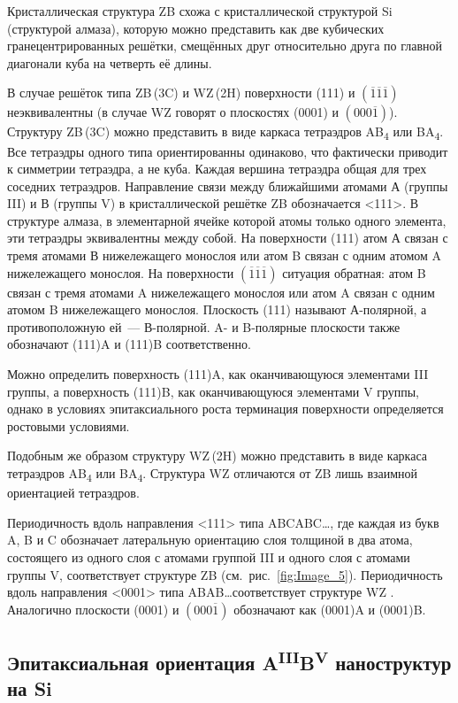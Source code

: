 Кристаллическая структура ZB схожа с кристаллической структурой Si (структурой
алмаза), которую можно представить как две кубических гранецентрированных
решётки, смещённых друг относительно друга по главной диагонали куба на
четверть её длины.

В случае решёток типа ZB\,(3C) и WZ\,(2H) поверхности (111) и
\((\overline{1}\overline{1}\overline{1})\) неэквивалентны (в случае WZ говорят
о плоскостях (0001) и \((000\overline{1})\)). Структуру ZB\,(3C) можно
представить в виде каркаса тетраэдров AB\textsubscript{4} или
BA\textsubscript{4}. Все тетраэдры одного типа ориентированны одинаково, что
фактически приводит к симметрии тетраэдра, а не куба. Каждая вершина тетраэдра
общая для трех соседних тетраэдров. Направление связи между ближайшими атомами
А (группы III) и В (группы V) в кристаллической решётке ZB обозначается <111>.
В структуре алмаза, в элементарной ячейке которой атомы только одного элемента,
эти тетраэдры эквивалентны между собой. На поверхности (111) атом А связан с
тремя атомами В нижележащего монослоя или атом B связан с одним атомом A
нижележащего монослоя. На поверхности
\((\overline{1}\overline{1}\overline{1})\) ситуация обратная: атом B связан с
тремя атомами A нижележащего монослоя или атом A связан с одним атомом B
нижележащего монослоя. Плоскость (111) называют А-полярной, а противоположную
ей~--- В-полярной. A- и B-полярные плоскости также обозначают (111)A и (111)B
соответственно.

Можно определить поверхность (111)A, как оканчивающуюся элементами III группы,
а поверхность (111)B, как оканчивающуюся элементами V группы, однако в условиях
эпитаксиального роста терминация поверхности определяется ростовыми условиями.

Подобным же образом структуру WZ\,(2H) можно представить в виде каркаса
тетраэдров AB\textsubscript{4} или BA\textsubscript{4}. Структура WZ отличаются
от ZB лишь взаимной ориентацией тетраэдров.

Периодичность вдоль направления <111> типа ABCABC\dots, где каждая из букв A, B
и C обозначает латеральную ориентацию слоя толщиной в два атома, состоящего из
одного слоя с атомами группой III и одного слоя с атомами группы V,
соответствует структуре ZB (см.~рис.~\cref{fig:Image_5}). Периодичность вдоль
направления <0001> типа ABAB\dots соответствует структуре WZ
\cite{Kriegner2011}. Аналогично плоскости (0001) и \((000\overline{1})\)
обозначают как (0001)A и (0001)B.

\subsection{Эпитаксиальная ориентация
A\textsuperscript{III}B\textsuperscript{V} наноструктур на
Si}\label{subsec:ch1/sec2/sub4}

